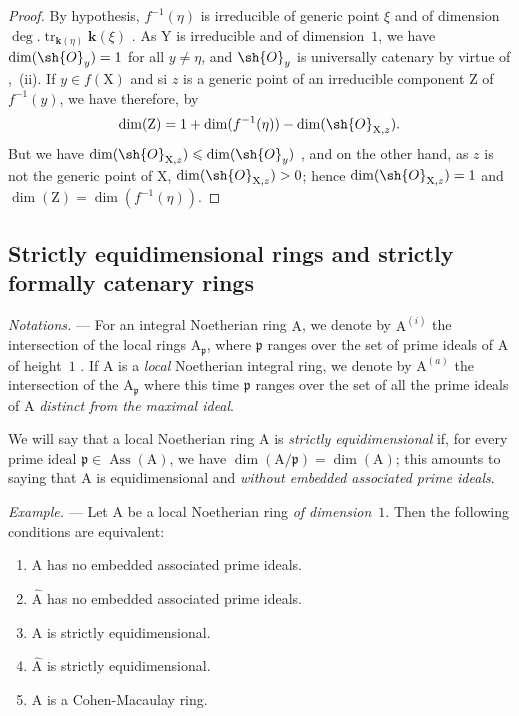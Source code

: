 \begin{proof}
By hypothesis, $f^{-1}(\eta)$ is irreducible of generic point $\xi$ and of dimension $\deg.\operatorname{tr}_{\boldsymbol{k}(\eta)}\boldsymbol{k}(\xi)$ .
As $\mathrm{Y}$ is irreducible and of dimension~$1$, we have $\dim(\sh{O}_y)=1$ for all $y\neq\eta$, and $\sh{O}_y$ is universally catenary by virtue of ,~(ii).
If $y\in f(\mathrm{X})$ and si $z$ is a generic point of an irreducible component $\mathrm{Z}$ of $f^{-1}(y)$, we have therefore, by 
\[
  \dim(\mathrm{Z})=1+\dim(f^{-1}(\eta))-\dim(\sh{O}_{\mathrm{X},z}).
\]
But we have $\dim(\sh{O}_{\mathrm{X},z})\leqslant\dim(\sh{O}_y)$ , and on the other hand, as $z$ is not the generic point of $\mathrm{X}$, $\dim(\sh{O}_{\mathrm{X},z})>0$; hence $\dim(\sh{O}_{\mathrm{X},z})=1$ and $\dim(\mathrm{Z})=\dim(f^{-1}(\eta))$.
\end{proof}


\subsection{Strictly equidimensional rings and strictly formally catenary rings}
\label{subsection:IV.7.2}

\begin{env}[7.2.1]
\label{IV.7.2.1}
\emph{Notations.} ---
For an integral Noetherian ring $\mathrm{A}$, we denote by $\mathrm{A}^{(i)}$ the intersection of the local rings $\mathrm{A}_\mathfrak{p}$, where $\mathfrak{p}$ ranges over the set of prime ideals of $\mathrm{A}$ of height~$1$ .
If $\mathrm{A}$ is a \emph{local} Noetherian integral ring, we denote by $\mathrm{A}^{(a)}$ the intersection of the $\mathrm{A}_\mathfrak{p}$ where this time $\mathfrak{p}$ ranges over the set of all the prime ideals of $\mathrm{A}$ \emph{distinct from the maximal ideal}.

We will say that a local Noetherian ring $\mathrm{A}$ is \emph{strictly equidimensional} if, for every prime ideal $\mathfrak{p}\in\operatorname{Ass}(\mathrm{A})$, we have $\dim(\mathrm{A}/\mathfrak{p})=\dim(\mathrm{A})$; this amounts to saying that $\mathrm{A}$ is equidimensional and \emph{without embedded associated prime ideals}.
\end{env}

\begin{env}[7.2.1.1]
\label{IV.7.2.1.1}
\emph{Example.} ---
Let $\mathrm{A}$ be a local Noetherian ring \emph{of dimension}~$1$.
Then the following conditions are equivalent:
\begin{enumerate}[label=\emph{\alph*)}]
  \item $\mathrm{A}$ has no embedded associated prime ideals.
  \item[\emph{a$'$)}] $\widehat{\mathrm{A}}$ has no embedded associated prime ideals.
  \item $\mathrm{A}$ is strictly equidimensional.
  \item[\emph{b$'$)}] $\widehat{\mathrm{A}}$ is strictly equidimensional.
  \item $\mathrm{A}$ is a Cohen-Macaulay ring.
\end{enumerate}
\end{env}

